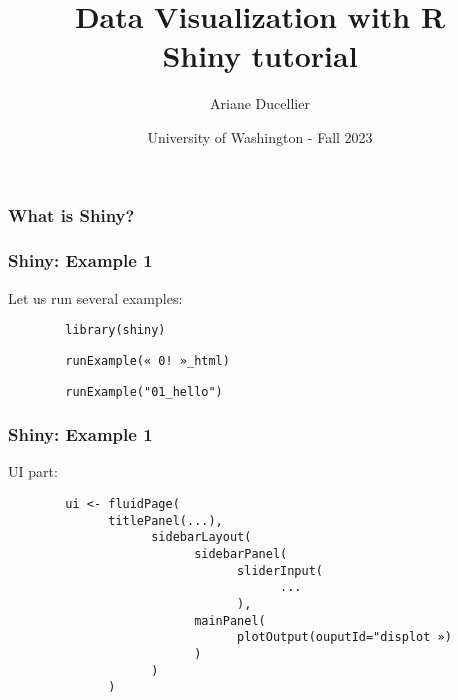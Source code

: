 \documentclass{beamer}
\title[Data Visualization with R - Shiny tutorial]{Data Visualization with R \\ Shiny tutorial}
\author{Ariane Ducellier}
\date{University of Washington - Fall 2023}
\begin{document}
	\begin{frame}
		\titlepage
	\end{frame}

	\begin{frame}
		\frametitle{What is Shiny?}
		
	\end{frame}

	\begin{frame}[fragile]
		\frametitle{Shiny: Example 1}

		Let us run several examples:

		\vspace{2em}

		\begin{exampleblock}{}
		\begin{BVerbatim}
		library(shiny)
		\end{BVerbatim}
		\end{exampleblock}{}

		\vspace{2em}

		\begin{exampleblock}{}
		\begin{BVerbatim}
		runExample(« 0! »_html)
		\end{BVerbatim}
		\end{exampleblock}{}

		\vspace{2em}

		\begin{exampleblock}{}
		\begin{BVerbatim}
		runExample("01_hello")
		\end{BVerbatim}
		\end{exampleblock}{}

	\end{frame}

	\begin{frame}[fragile]
		\frametitle{Shiny: Example 1}

		UI part:

		\begin{exampleblock}{}
		\begin{BVerbatim}
		ui <- fluidPage(
		      titlePanel(...),
		            sidebarLayout(
		                  sidebarPanel(
		                        sliderInput(
		                              ...
		                        ),
		                  mainPanel(
		                        plotOutput(ouputId="displot »)
		                  )
		            )
		      )
		\end{BVerbatim}
		\end{exampleblock}{}

	\end{frame}
\end{document}
